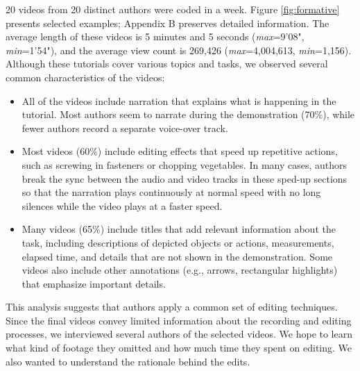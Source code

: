20 videos from 20 distinct authors were coded in a week. Figure \ref{fig:formative} presents selected examples; Appendix B preserves detailed information.
The average length of these videos is 5 minutes and 5 seconds (\emph{max}=9'08",
\emph{min}=1'54"), and the average view count is 269,426
(\emph{max}=4,004,613, \emph{min}=1,156). Although these tutorials
cover various topics and tasks, we observed several common
characteristics of the videos:

\begin{itemize}
  \setlength{\itemsep}{0pt}

\item {} All of the videos include narration that
  explains what is happening in the tutorial. Most authors seem to
  narrate during the demonstration (70\%), while fewer authors record a
  separate voice-over track.

\item {} Most videos (60\%) include editing
  effects that speed up repetitive actions, such as screwing in
  fasteners or chopping vegetables. In many cases, authors break the
  sync between the audio and video tracks in these sped-up sections so
  that the narration plays continuously at normal speed with no long
  silences while the video plays at a faster speed.

\item {} Many videos (65\%) include titles
  that add relevant information about the task, including descriptions
  of depicted objects or actions, measurements, elapsed time, and
  details that are not shown in the demonstration. Some videos also
  include other annotations (e.g., arrows, rectangular highlights)
  that emphasize important details.

\end{itemize}

This analysis suggests that authors apply a common set of editing
techniques. Since the final videos convey limited information
about the recording and editing processes, we
interviewed several authors of the selected videos.
We hope to learn what kind of footage they omitted and how much time they spent on editing. We also wanted to understand the rationale behind the edits.


